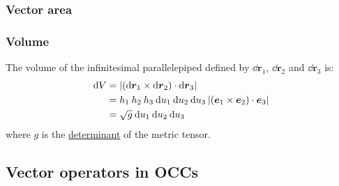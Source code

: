\documentclass{article}
\begin{document}
\newpage

\subsubsection{Vector area}

\subsubsection{Volume}
The volume of the infinitesimal parallelepiped defined by
$\dd\boldsymbol{r}_1$, $\dd\boldsymbol{r}_2$ and $\dd\boldsymbol{r}_3$ is:
\begin{align*}
    \dd V
    &=|(\dd\boldsymbol{r}_1\times\dd\boldsymbol{r}_2)
    \cdot\dd\boldsymbol{r}_3| \\
    &=h_1\hspace{0.03in}h_2\hspace{0.03in}h_3\hspace{0.03in}
    \dd u_1\hspace{0.03in}\dd u_2\hspace{0.03in}\dd u_3\hspace{0.03in}
    |(\boldsymbol{e}_1\times\boldsymbol{e}_2)
    \cdot\boldsymbol{e}_3| \\
    &=\sqrt{g}\hspace{0.03in}
    \dd u_1\hspace{0.03in}\dd u_2\hspace{0.03in}\dd u_3\hspace{0.03in}
\end{align*}
where $g$ is the \underline{determinant} of the metric tensor.

\newpage

\subsection{Vector operators in OCCs}
\end{document}
